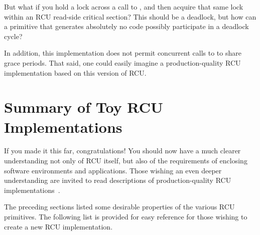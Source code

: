 \QuickQuiz{}
	But what if you hold a lock across a call to
	, and then acquire that same lock within
	an RCU read-side critical section?
	This should be a deadlock, but how can a primitive that
	generates absolutely no code possibly participate in a
	deadlock cycle?
 \QuickQuizEnd

In addition, this implementation does not permit concurrent calls
to  to share grace periods.
That said, one could easily imagine a production-quality RCU
implementation based on this version of RCU.

\section{Summary of Toy RCU Implementations}
\label{sec:app:toyrcu:Summary of Toy RCU Implementations}

If you made it this far, congratulations!
You should now have a much clearer understanding
not only of RCU itself, but also of the requirements of enclosing
software environments and applications.
Those wishing an even deeper understanding are invited to read
descriptions of production-quality RCU
implementations~\cite{MathieuDesnoyers2012URCU,PaulEMcKenney2007PreemptibleRCU,PaulEMcKenney2008HierarchicalRCU,PaulEMcKenney2009BloatwatchRCU}.

The preceding sections listed some desirable properties of the
various RCU primitives.
The following list is provided for easy reference for those wishing to
create a new RCU implementation.

